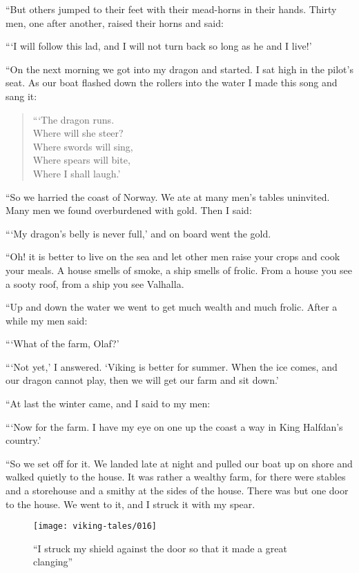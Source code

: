 ``But others jumped to their feet with their mead-horns in their hands.
Thirty men, one after another, raised their horns and said:

```I will follow this lad, and I will not turn back so long as he and I
live!'

``On the next morning we got into my dragon and started. I sat high in
the pilot's seat. As our boat flashed down the rollers into the water I
made this song and sang it:

\begin{quote}
```The dragon runs.\\
Where will she steer?\\
Where swords will sing,\\
Where spears will bite,\\
Where I shall laugh.'
\end{quote}

``So we harried the coast of Norway. We ate at many men's tables
uninvited. Many men we found overburdened with gold. Then I said:

```My dragon's belly is never full,' and on board went the gold.

``Oh! it is better to live on the sea and let other men raise your crops
and cook your meals. A house smells of smoke, a ship smells of frolic.
From a house you see a sooty roof, from a ship you see Valhalla.

``Up and down the water we went to get much wealth and much frolic. After
a while my men said:

```What of the farm, Olaf?'

```Not yet,' I answered. `Viking is better for summer. When the ice
comes, and our dragon cannot play, then we will get our farm and sit
down.'

``At last the winter came, and I said to my men:

```Now for the farm. I have my eye on one up the coast a way in King
Halfdan's country.'

``So we set off for it. We landed late at night and pulled our boat up on
shore and walked quietly to the house. It was rather a wealthy farm, for
there were stables and a storehouse and a smithy at the sides of the
house. There was but one door to the house. We went to it, and I struck
it with my spear.

\begin{figure}
    \centering
    \texttt{[image: viking-tales/016]}
    \caption{
        ``I struck my shield against the door so that it made a great
        clanging''}
\end{figure}


